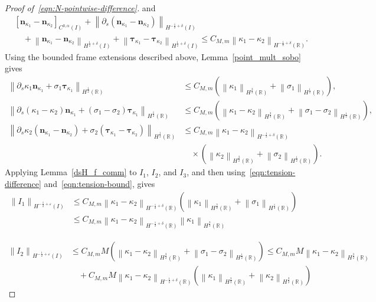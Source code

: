 \documentclass[11pt,reqno]{amsart}
\theoremstyle{plain}
\theoremstyle{definition}
\numberwithin{equation}{section}
\newcommand{\paren}[1]{\left(#1\right)}
\newcommand{\p}{\partial}
\newcommand{\bm}[1]{\boldsymbol{#1}}
\newcommand{\norm}[1]{\left\lVert #1 \right\rVert}
\newcommand{\R}{\mathbb{R}}
\newcommand{\tka}[1]{\bm\tau_{\kappa_{#1}}}
\newcommand{\nka}[1]{\bm n_{\kappa_{#1}}}
\newcommand{\ci}[1]{C^{#1}(I)}
\newcommand{\hi}[1]{H^{#1}(I)}
\newcommand{\hr}[1]{H^{#1}(\R)}
\begin{document}
\begin{proof}[Proof of~\eqref{eqn:N-pointwise-difference}]
and
\begin{equation}\label{eqn:N-frame-difference}
\begin{aligned}
    &[\nka{1}-\nka{2}]_{\ci{0,\alpha}} +\norm{\p_s(\nka{1}-\nka{2})}_{\hi{-\frac{1}{2}+\delta}} \\
    &\quad +\norm{\nka{1}-\nka{2}}_{\hi{\frac{1}{2}+\delta}} +\norm{\tka{1}-\tka{2}}_{\hi{\frac{1}{2}+\delta}}
    \le C_{M,m} \norm{\kappa_1-\kappa_2}_{\hr{-\frac{1}{2}+\delta}}.
\end{aligned}
\end{equation}
Using the bounded frame extensions described above,
Lemma~\ref{point_mult_sobo} gives
\begin{equation}\label{eqn:N-density-bounds}
\begin{aligned}
    \norm{\p_s\kappa_1\nka{1}+\sigma_1\tka{1}}_{\hr{\frac{1}{2}}}
    &\le C_{M,m}
    \paren{
        \norm{\kappa_1}_{\hr{\frac{3}{2}}}
        +\norm{\sigma_1}_{\hr{\frac{1}{2}}}
    }, \\
    \norm{
        \p_s(\kappa_1-\kappa_2)\nka{1}
        +(\sigma_1-\sigma_2)\tka{1}
    }_{\hr{\frac{1}{2}}}
    &\le C_{M,m}
    \paren{
        \norm{\kappa_1-\kappa_2}_{\hr{\frac{3}{2}}}
        +\norm{\sigma_1-\sigma_2}_{\hr{\frac{1}{2}}}
    }, \\
    \norm{
        \p_s\kappa_2(\nka{1}-\nka{2})
        +\sigma_2(\tka{1}-\tka{2})
    }_{\hr{\frac{1}{2}}}
    &\le C_{M,m}
    \norm{\kappa_1-\kappa_2}_{\hr{-\frac{1}{2}+\delta}} \\
    &\quad\times
    \paren{
        \norm{\kappa_2}_{\hr{\frac{3}{2}}}
        +\norm{\sigma_2}_{\hr{\frac{1}{2}}}
    }.
\end{aligned}
\end{equation}
Applying Lemma~\ref{dsH_f_comm} to $I_1$, $I_2$, and $I_3$, and then
using~\eqref{eqn:tension-difference} and~\eqref{eqn:tension-bound}, gives
\begin{equation}
\begin{aligned}
    \norm{I_1}_{\hi{-\frac{1}{2}+\varepsilon}} &\le C_{M,m} \norm{\kappa_1-\kappa_2}_{\hr{-\frac{1}{2}+\delta}} \paren{ \norm{\kappa_1}_{\hr{\frac{3}{2}}} + \norm{\sigma_1}_{\hr{\frac{1}{2}}} }  \\
    & \le C_{M,m} \norm{\kappa_1-\kappa_2}_{\hr{-\frac{1}{2}+\delta}} \norm{\kappa_1}_{\hr{\frac{3}{2}}}
\end{aligned}
\end{equation}

\begin{equation}
\begin{aligned}
    \norm{I_2}_{\hi{-\frac{1}{2}+\varepsilon}} &\le C_{M,m}M \paren{ \norm{\kappa_1-\kappa_2}_{\hr{\frac{3}{2}}}
    +\norm{\sigma_1-\sigma_2}_{\hr{\frac{1}{2}}} } \le C_{M,m}M \norm{\kappa_1-\kappa_2}_{\hr{\frac{3}{2}}} \\
    &\quad + C_{M,m}M \norm{\kappa_1-\kappa_2}_{\hr{-\frac{1}{2}+\delta}} \paren{
    \norm{\kappa_1}_{\hr{\frac{3}{2}}} +\norm{\kappa_2}_{\hr{\frac{3}{2}}} }
\end{aligned}
\end{equation}


\end{proof}
\end{document}
